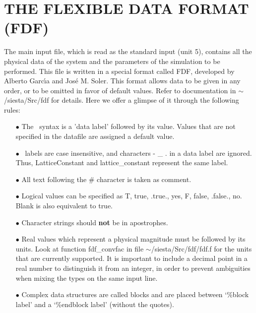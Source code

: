 \section{THE FLEXIBLE DATA FORMAT (FDF)}

The main input file,
which is read as the standard input (unit 5),
contains all the physical data of the system and the parameters of
the simulation to be performed.
This file is written in a special format called FDF, developed by
Alberto Garc\'{\i}a and Jos\'e M. Soler. This format allows data to be
given in any order, or to be omitted in favor of default values.
Refer to documentation in $\sim$/siesta/Src/fdf for details.
Here we offer a glimpse of it through the following rules:

\begin{itemize}

\item[$\bullet$] The \fdflib\ syntax is a 'data label' followed by its value.
Values that are not specified in the datafile are assigned
a default value.

\item[$\bullet$] \fdflib\ labels are case insensitive, and characters - \_ .
in a data label are ignored. Thus, LatticeConstant and
lattice\_constant represent the same label.

\item[$\bullet$] All text following the \# character is taken as comment.

\item[$\bullet$] Logical values can be specified as T, true, .true.,
yes, F, false, .false., no. Blank is also equivalent to true.

\item[$\bullet$] Character strings should \textbf{not} be in apostrophes.

\item[$\bullet$] Real values which represent a physical magnitude must be
followed by its units. Look at function fdf\_convfac in
file $\sim$/siesta/Src/fdf/fdf.f for the units that are currently supported.
It is important to include a decimal point in a real number to distinguish
it from an integer, in order to prevent ambiguities when mixing the types
on the same input line.

\item[$\bullet$] Complex data structures are called blocks and are
placed between `\%block label' and a `\%endblock label'
(without the quotes).


\end{itemize}
